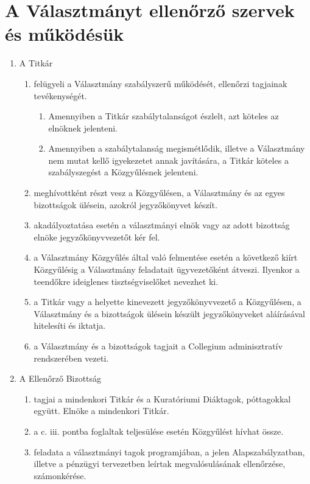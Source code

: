 \documentclass{../styles/rulebook}
\begin{document}
\section{A Választmányt ellenőrző szervek és működésük}

\begin{enumerate}
	\item A Titkár
	\begin{enumerate}
		\item felügyeli a Választmány szabályszerű működését, ellenőrzi tagjainak tevékenységét.
		\begin{enumerate}
			\item Amennyiben a Titkár szabálytalanságot észlelt, azt köteles az elnöknek jelenteni.
			\item Amennyiben a szabálytalanság megismétlődik, illetve a Választmány nem mutat kellő igyekezetet annak javítására, a Titkár köteles a szabályszegést a Közgyűlésnek jelenteni.
		\end{enumerate}
		\item meghívottként részt vesz a Közgyűlésen, a Választmány és az egyes bizottságok ülésein, azokról jegyzőkönyvet készít.
		\item akadályoztatása esetén a választmányi elnök vagy az adott bizottság elnöke jegyzőkönyvvezetőt kér fel.
		\item a Választmány Közgyűlés által való felmentése esetén a következő kiírt Közgyűlésig a Választmány feladatait ügyvezetőként átveszi. Ilyenkor a teendőkre ideiglenes tisztségviselőket nevezhet ki.
		\item a Titkár vagy a helyette kinevezett jegyzőkönyvvezető a Közgyűlésen, a Választmány és a bizottságok ülésein készült jegyzőkönyveket aláírásával hitelesíti és iktatja.
		\item a Választmány és a bizottságok tagjait a Collegium adminisztratív rendszerében vezeti.
	\end{enumerate}
	\item A Ellenőrző Bizottság
	\begin{enumerate}
		\item tagjai a mindenkori Titkár és a Kuratóriumi Diáktagok, póttagokkal együtt. Elnöke a mindenkori Titkár.
		\item a c. iii. pontba foglaltak teljesülése esetén Közgyűlést hívhat össze. 
		\item feladata a választmányi tagok programjában, a jelen Alapszabályzatban, illetve a pénzügyi tervezetben leírtak megvalósulásának ellenőrzése, számonkérése.
		\begin{enumerate}

\end{enumerate}
\end{enumerate}
\end{enumerate}
\end{document}
